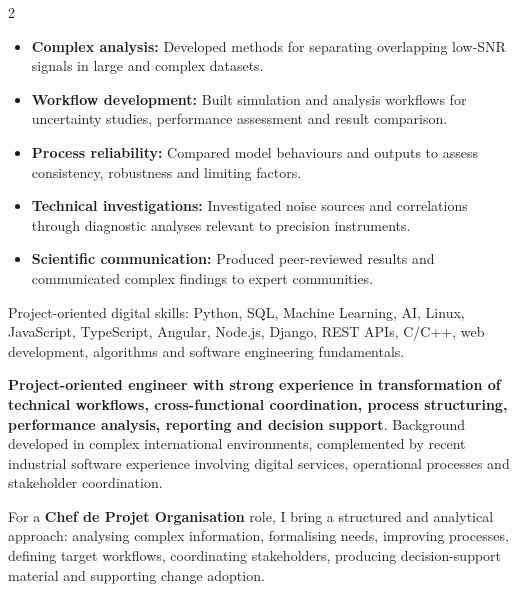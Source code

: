 \documentclass[8pt,a4paper,ragged2e,withhyper]{altacv}
\begin{document}
\begin{paracol}{2}
\begin{itemize}
  \item \textbf{Complex analysis:} Developed methods for separating overlapping low-SNR signals in large and complex datasets.
  \item \textbf{Workflow development:} Built simulation and analysis workflows for uncertainty studies, performance assessment and result comparison.
  \item \textbf{Process reliability:} Compared model behaviours and outputs to assess consistency, robustness and limiting factors.
  \item \textbf{Technical investigations:} Investigated noise sources and correlations through diagnostic analyses relevant to precision instruments.
  \item \textbf{Scientific communication:} Produced peer-reviewed results and communicated complex findings to expert communities.
\end{itemize}




\divider


\divider


\small{
Project-oriented digital skills: Python, SQL, Machine Learning, AI, Linux, JavaScript, TypeScript, Angular, Node.js, Django, REST APIs, C/C++, web development, algorithms and software engineering fundamentals.
}

\switchcolumn


\textbf{Project-oriented engineer with strong experience in transformation of technical workflows, cross-functional coordination, process structuring, performance analysis, reporting and decision support}. Background developed in complex international environments, complemented by recent industrial software experience involving digital services, operational processes and stakeholder coordination.

For a \textbf{Chef de Projet Organisation} role, I bring a structured and analytical approach: analysing complex information, formalising needs, improving processes, defining target workflows, coordinating stakeholders, producing decision-support material and supporting change adoption.


\end{paracol}
\end{document}
